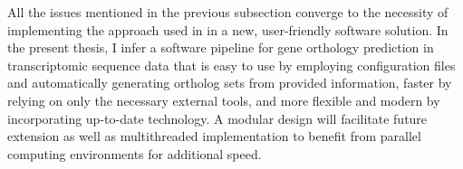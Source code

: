All the issues mentioned in the previous subsection converge to the necessity of
implementing the approach used in \hamstr in a new, user-friendly software
solution. In the present thesis, I infer a software pipeline for gene orthology
prediction in transcriptomic sequence data that is easy to use by employing
configuration files and automatically generating ortholog sets from provided
information, faster by relying on only the necessary external tools, and more
flexible and modern by incorporating up-to-date technology. A modular design
will facilitate future extension as well as multithreaded implementation to
benefit from parallel computing environments for additional speed.

